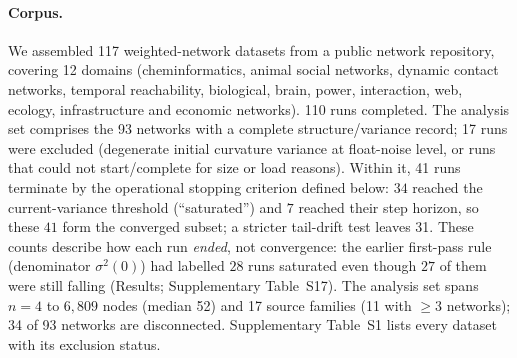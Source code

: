 \documentclass[11pt]{article}
\begin{document}
\paragraph{Corpus.} We assembled 117 weighted-network datasets from a public
network repository, covering 12 domains (cheminformatics, animal social
networks, dynamic contact networks, temporal reachability, biological,
brain, power, interaction, web, ecology, infrastructure and economic
networks). 110 runs completed. The analysis set comprises the 93 networks
with a complete structure/variance record; 17 runs were excluded (degenerate
initial curvature variance at float-noise level, or runs that could not
start/complete for size or load reasons). Within it, 41 runs terminate by the
operational stopping criterion defined below: $34$ reached the current-variance
threshold (``saturated'') and $7$ reached their step horizon, so these $41$
form the converged subset; a stricter tail-drift test leaves 31. These counts
describe how each run \emph{ended}, not convergence: the earlier first-pass rule
(denominator $\sigma^2(0)$) had labelled $28$ runs saturated even though $27$
of them were still falling (Results; Supplementary Table~S17). The
analysis set spans $n=4$ to $6{,}809$ nodes (median 52) and 17 source
families (11 with $\ge 3$ networks); 34 of 93 networks are disconnected.
Supplementary Table~S1 lists every dataset with its exclusion status.
\end{document}
